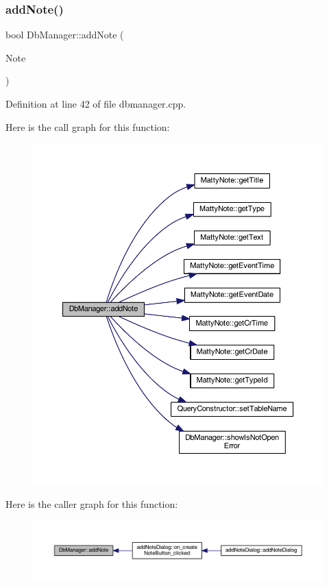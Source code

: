 \subsubsection{\texorpdfstring{add\+Note()}{addNote()}}
{\footnotesize\ttfamily bool Db\+Manager\+::add\+Note (\begin{DoxyParamCaption}\item[{\hyperlink{classMattyNote}{Matty\+Note} \&}]{Note }\end{DoxyParamCaption})\hspace{0.3cm}{\ttfamily [static]}}



Definition at line 42 of file dbmanager.\+cpp.

Here is the call graph for this function\+:
\nopagebreak
\begin{figure}[H]
\begin{center}
\leavevmode
\includegraphics[width=350pt]{classDbManager_a4f063b57678616ccef3515088a04ac51_cgraph}
\end{center}
\end{figure}
Here is the caller graph for this function\+:
\nopagebreak
\begin{figure}[H]
\begin{center}
\leavevmode
\includegraphics[width=350pt]{classDbManager_a4f063b57678616ccef3515088a04ac51_icgraph}
\end{center}
\end{figure}
\hypertarget{classDbManager_abc90b3bf97dda268b4160a0662305898}{}\label{classDbManager_abc90b3bf97dda268b4160a0662305898} 
